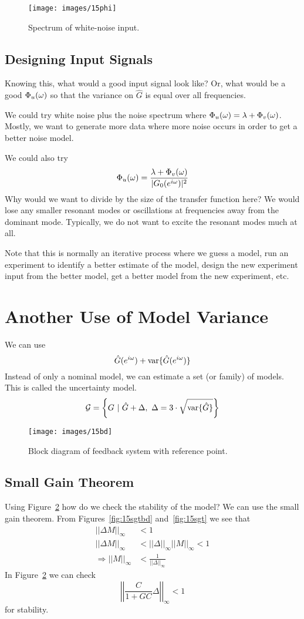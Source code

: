 \begin{figure}[ht!]
\centering
\texttt{[image: images/15phi]}
\caption{Spectrum of white-noise input.}
\label{fig:15phi}
\end{figure}

\subsection{Designing Input Signals}
Knowing this, what would a good input signal look like? Or, what would be a good $\Phi_u(\omega)$ so that the variance on $\hat{G}$ is equal over all frequencies.

We could try white noise plus the noise spectrum where $\Phi_u(\omega)=\lambda+\Phi_v(\omega)$.
Mostly, we want to generate more data where more noise occurs in order to get a better noise model.

We could also try
$$\Phi_u(\omega) = \frac{\lambda+\Phi_v(\omega)}{|G_0(e^{i\omega})|^2}$$
Why would we want to divide by the size of the transfer function here? We would lose any smaller resonant modes or oscillations at frequencies away from the dominant mode.
Typically, we do not want to excite the resonant modes much at all.

Note that this is normally an iterative process where we guess a model, run an experiment to identify a better estimate of the model, design the new experiment input from the better model, get a better model from the new experiment, etc.

\section{Another Use of Model Variance}
We can use
$$\hat{G}(e^{i\omega}) + \text{var}\{\hat{G}(e^{i\omega})\}$$
Instead of only a nominal model, we can estimate a set (or family) of models.
This is called the uncertainty model.
$$\mathcal{G} = \left\lbrace G~|~\hat{G}+\Delta,~\Delta=3\cdot\sqrt{\text{var}\{\hat{G}\}}\right\rbrace$$

\begin{figure}[ht!]
\centering
\texttt{[image: images/15bd]}
\caption{Block diagram of feedback system with reference point.}
\label{fig:15bd}
\end{figure}

\subsection{Small Gain Theorem}
\label{sec:15sgt}
Using Figure~\ref{fig:15bd} how do we check the stability of the model? We can use the small gain theorem.
From Figures~\ref{fig:15sgtbd} and~\ref{fig:15sgt} we see that
\begin{align*}
||\Delta M||_\infty &< 1 \\
||\Delta M||_\infty &< ||\Delta||_\infty||M||_\infty < 1 \\
\Rightarrow ||M||_\infty &< \frac{1}{||\Delta||_\infty}
\end{align*}
In Figure~\ref{fig:15bd} we can check
$$\left|\left|\frac{C}{1+GC}\Delta\right|\right|_\infty < 1$$
for stability.

